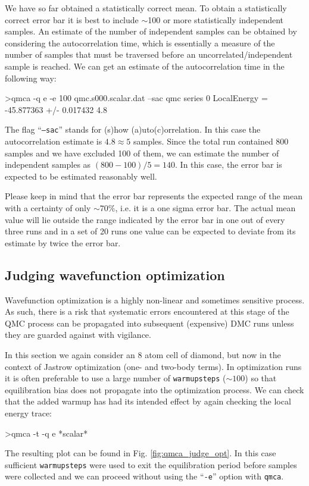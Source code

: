 We have so far obtained a statistically correct mean.  To obtain 
a statistically correct error bar it is best to include $\sim$100 or more 
statistically independent samples.  An estimate of the number 
of independent samples can be obtained by considering the 
autocorrelation time, which is essentially a measure of the number of 
samples that must be traversed before an uncorrelated/independent sample 
is reached.  We can get an estimate of the autocorrelation time 
in the following way:
\begin{shade}
>qmca -q e -e 100 qmc.s000.scalar.dat --sac
qmc  series 0  LocalEnergy           =  -45.877363 +/- 0.017432    4.8 
\end{shade}
\noindent
The flag ``\texttt{--sac}'' stands for (s)how (a)uto(c)orrelation.  
In this case the autocorrelation estimate is $4.8\approx 5$ samples. 
Since the total run contained 800 samples and we have excluded 100 of 
them, we can estimate the number of independent samples as 
$(800-100)/5=140$.  In this case, the error bar is expected to be 
estimated reasonably well.

Please keep in mind that the error bar represents the expected range
of the mean with a certainty of only $\sim 70\%$, i.e. it is a one
sigma error bar.  The actual mean value will lie outside the range
indicated by the error bar in one out of every three runs and in a set
of 20 runs one value can be expected to deviate from its estimate by
twice the error bar.


\subsection{Judging wavefunction optimization}
\label{sec:qmca_judge_opt}
Wavefunction optimization is a highly non-linear and sometimes 
sensitive process.  As such, there is a risk that systematic 
errors encountered at this stage of the QMC process can be propagated 
into subsequent (expensive) DMC runs unless they are guarded against 
with vigilance.

In this section we again consider an 8 atom cell of diamond, but 
now in the context of Jastrow optimization (one- and two-body terms). 
In optimization runs it is often preferable to use a large number 
of \texttt{warmupsteps} ($\sim 100$) so that equilibration bias does 
not propagate into the optimization process.  We can check that 
the added warmup has had its intended effect by again checking the 
local energy trace:
\begin{shade}
>qmca -t -q e *scalar*
\end{shade}
\noindent
The resulting plot can be found in Fig. \ref{fig:qmca_judge_opt}. 
In this case sufficient \texttt{warmupsteps} were used to exit 
the equilibration period before samples were collected and we can 
proceed without using the ``\texttt{-e}'' option with \texttt{qmca}.

